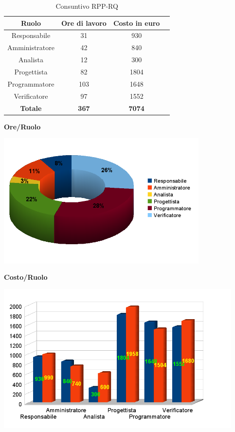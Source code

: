 \newpage

\begin{table}[h]
	\begin{center}
		  \begin{tabular}{|c|c|c|c|}
		 \hline 
		 \textbf{Ruolo} & \textbf{Ore di lavoro} & \textbf{Costo in euro}\\
		 \hline
		Responsabile & 31 & 930 \\
		Amministratore & 42 & 840\\
		Analista & 12 & 300\\
		Progettista & 82 & 1804\\
		Programmatore & 103 & 1648 \\
		Verificatore & 97 & 1552\\
        \hline
        \textbf{Totale} & \textbf{367} & \textbf{7074}\\
		\hline
		\end{tabular}
	\caption{Consuntivo RPP-RQ} 
	\label{tab:cons_RPP-RQ}
	\end{center}	
\end{table}

\begin{center}\textbf{Ore/Ruolo}
\end{center}
\includegraphics[width=300pt]{Cons-RPP-RQ1}
\newpage

\begin{center}\textbf{Costo/Ruolo}
\end{center}
\includegraphics[width=350pt]{Cons-RPP-RQ2}


